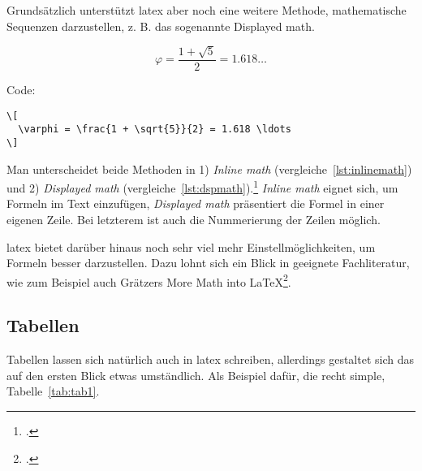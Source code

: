 Grundsätzlich unterstützt \gls{latex} aber noch eine weitere Methode, mathematische Sequenzen darzustellen, z. B. das sogenannte \glqq Displayed math\grqq.

\[
  \varphi = \frac{1 + \sqrt{5}}{2} = 1.618 \ldots
\]

Code:

\begin{lstlisting}[float=htb,caption=Darstellungen von Mathe mit der \glqq displayed math\grqq-Methode,label=lst:dspmath]
\[
  \varphi = \frac{1 + \sqrt{5}}{2} = 1.618 \ldots
\]
\end{lstlisting}

Man unterscheidet beide Methoden in 1) \emph{Inline math} (vergleiche~\ref{lst:inlinemath}) und 2) \emph{Displayed math} (vergleiche~\ref{lst:dspmath}).\footcite[Vgl. ][S. 276]{kottwitz_latex_2015} \emph{Inline math} eignet sich, um Formeln im Text einzufügen, \emph{Displayed math} präsentiert die Formel in einer eigenen Zeile. Bei letzterem ist auch die Nummerierung der Zeilen möglich.

\gls{latex} bietet darüber hinaus noch sehr viel mehr Einstellmöglichkeiten, um Formeln besser darzustellen. Dazu lohnt sich ein Blick in geeignete Fachliteratur, wie zum Beispiel auch Grätzers \glqq More Math into \LaTeX{}\grqq\footcite{gratzer_more_2016}.
\subsection{Tabellen}%
\label{sec:tables}
Tabellen lassen sich natürlich auch in \gls{latex} schreiben, allerdings gestaltet sich das auf den ersten Blick etwas umständlich. Als Beispiel dafür, die recht simple, Tabelle~\ref{tab:tab1}.
\begin{table}[htbp]
\caption{Eine einfache Tabelle}
\label{tab:tab1}
\end{table}

